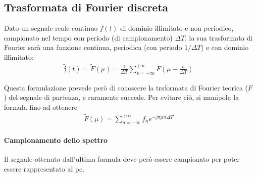 \documentclass[a4paper, 10pt]{report}
\begin{document}
\subsection*{Trasformata di Fourier discreta}

Dato un segnale reale continuo $f(t)$ di dominio illimitato e non periodico, campionato nel tempo con periodo (di campionamento) $\Delta T$, la sua trasformata di Fourier sarà una funzione continua, periodica (con periodo $1/\Delta T$) e con dominio illimitato:
\begin{align*}
\mathfrak{\tilde{f}}(t) = \tilde{F}(\mu) = \frac{1}{\Delta T} \sum_{n = -\infty}^{+\infty}F\left( \mu - \frac{n}{\Delta T}\right)
\end{align*}

\noindent Questa formulazione prevede però di conoscere la trsformata di Fourier teorica ($F$) del segnale di partenza, e raramente succede. Per evitare ciò, si manipola la formula fino ad ottenere
\begin{align*}
\tilde{F}(\mu) = \sum_{n = -\infty}^{+\infty}f_n e^{-j\pi \mu n \Delta T}
\end{align*} 

\paragraph*{Campionamento dello spettro} Il segnale ottenuto dall'ultima formula deve però essere campionato per poter essere rappresentato al pc.
\end{document}
